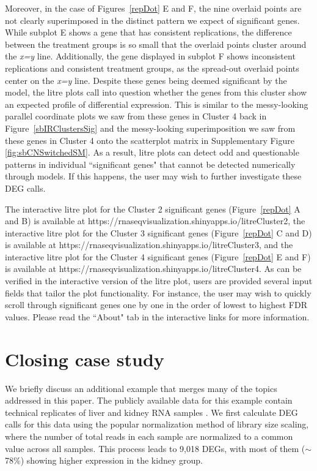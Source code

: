 \documentclass[11pt,a4paper,oldfontcommands,openany]{memoir}
\numberwithin{equation}{section} %
\begin{document}
Moreover, in the case of Figures~\ref{repDot} E and F, the nine overlaid points are not clearly superimposed in the distinct pattern we expect of significant genes. While subplot E shows a gene that has consistent replications, the difference between the treatment groups is so small that the overlaid points cluster around the \textit{x=y} line. Additionally, the gene displayed in subplot F shows inconsistent replications and consistent treatment groups, as the spread-out overlaid points center on the \textit{x=y} line. Despite these genes being deemed significant by the model, the litre plots call into question whether the genes from this cluster show an expected profile of differential expression. This is similar to the messy-looking parallel coordinate plots we saw from these genes in Cluster 4 back in Figure~\ref{sbIRClustersSig} and the messy-looking superimposition we saw from these genes in Cluster 4 onto the scatterplot matrix in Supplementary Figure \ref{fig:sbCNSwitchedSM}. As a result, litre plots can detect odd and questionable patterns in individual ``significant genes" that cannot be detected numerically through models. If this happens, the user may wish to further investigate these DEG calls.

The interactive litre plot for the Cluster 2 significant genes (Figure~\ref{repDot} A and B) is available at https://rnaseqvisualization.shinyapps.io/litreCluster2, the interactive litre plot for the Cluster 3 significant genes (Figure~\ref{repDot} C and D) is available at https://rnaseqvisualization.shinyapps.io/litreCluster3, and the interactive litre plot for the Cluster 4 significant genes (Figure~\ref{repDot} E and F) is available at https://rnaseqvisualization.shinyapps.io/litreCluster4. As can be verified in the interactive version of the litre plot, users are provided several input fields that tailor the plot functionality. For instance, the user may wish to quickly scroll through significant genes one by one in the order of lowest to highest FDR values. Please read the ``About" tab in the interactive links for more information.

\section{Closing case study}

We briefly discuss an additional example that merges many of the topics addressed in this paper. The publicly available data for this example contain technical replicates of liver and kidney RNA samples \citep{Marioni}. We first calculate DEG calls for this data using the popular normalization method of library size scaling, where the number of total reads in each sample are normalized to a common value across all samples. This process leads to 9,018 DEGs, with most of them ($\sim$78\%) showing higher expression in the kidney group.
\end{document}

